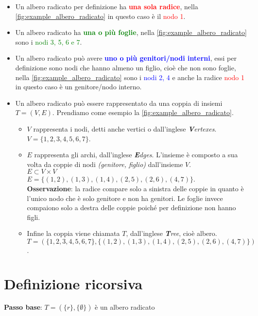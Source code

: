 \begin{itemize}
    \item Un albero radicato per definizione ha \textcolor{red}{\textbf{una sola radice}}, nella \autoref{fig:example_albero_radicato} in questo caso è il \textcolor{red}{nodo 1}.
    \item Un albero radicato ha \textcolor{green}{\textbf{una o più foglie}}, nella \autoref{fig:example_albero_radicato} sono i \textcolor{green}{nodi 3, 5, 6 e 7}.
    \item Un albero radicato può avere \textcolor{blue}{\textbf{uno o più genitori/nodi interni}}, essi per definizione sono nodi che hanno almeno un figlio, cioè che non sono foglie, nella \autoref{fig:example_albero_radicato} sono i \textcolor{blue}{nodi 2, 4} e anche la radice \textcolor{red}{nodo 1} in questo caso è un genitore/nodo interno.
    \item Un albero radicato può essere rappresentato da una coppia di insiemi $T=(V, E)$. Prendiamo come esempio la \autoref{fig:example_albero_radicato}.
    \begin{itemize}
        \item $V$ rappresenta i nodi, detti anche vertici o dall'inglese \emph{\textbf{V}ertexes}. \\
        $V=\{1, 2, 3, 4, 5, 6, 7\}$. 
        \item $E$ rappresenta gli archi, dall'inglese \emph{\textbf{E}dges}. L'insieme è composto a sua volta da coppie di nodi \textit{(genitore, figlio)} dall'insieme $V$. \\
        $E \subset V \times V$\\
        $E=\{(1, 2), (1, 3), (1, 4), (2, 5), (2, 6), (4, 7)\}$. \\
        \textbf{Osservazione}: la radice compare solo a sinistra delle coppie in quanto è l'unico nodo che è solo genitore e non ha genitori. Le foglie invece compaiono solo a destra delle coppie poiché per definizione non hanno figli.
        \item Infine la coppia viene chiamata $T$, dall'inglese \emph{\textbf{T}ree}, cioè albero. \\
        $T=(\{1, 2, 3, 4, 5, 6, 7\},\{(1, 2), (1, 3), (1, 4), (2, 5), (2, 6), (4, 7)\})$. \\
    \end{itemize}
\end{itemize}

\section{Definizione ricorsiva}
\textbf{Passo base}: $T=(\{r\}, \{\emptyset\})$ è un albero radicato

